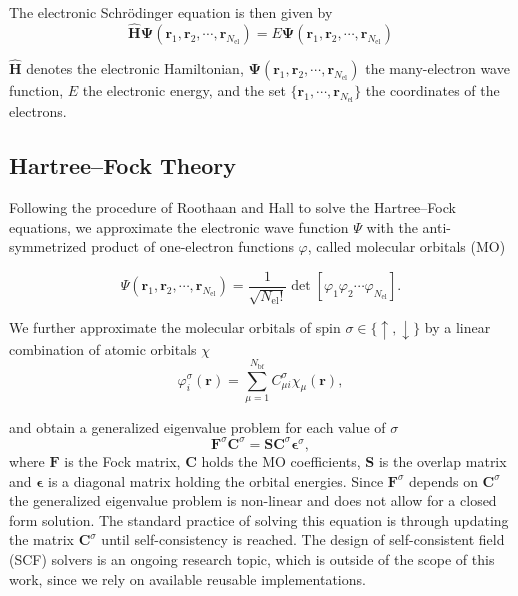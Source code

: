 \documentclass{article}
\begin{document}
The electronic Schrödinger equation is then given by
\begin{equation}
  \mathbf{\hat H} \mathbf \Psi(\mathbf r_1, \mathbf r_2, \cdots
  ,\mathbf r_{N_{\text{el}}}) = E\mathbf \Psi(\mathbf r_1,
  \mathbf r_2, \cdots ,\mathbf r_{N_{\text{el}}})
  \label{eq:SE}
\end{equation}

$\mathbf{\hat H}$ denotes the electronic Hamiltonian, $\mathbf
\Psi(\mathbf r_1, \mathbf r_2, \cdots ,\mathbf r_{N_{\text{el}}})$ the
many-electron wave function, $E$ the electronic energy, and the set
$\{\mathbf r_1, \cdots ,\mathbf{r}_{N_{\text{el}}}\}$ the coordinates
of the electrons.

\subsection{Hartree--Fock Theory}\label{subsec:HF}

Following the procedure of Roothaan and Hall \cite{Roothaan1951,
Hall1951} to solve the Hartree--Fock equations, we approximate the
electronic wave function $\Psi$ with the anti-symmetrized product of
one-electron functions $\varphi$, called molecular orbitals (MO)

\begin{equation}
  \Psi(\mathbf r_1, \mathbf r_2,\cdots, \mathbf
  r_{N_{\text{el}}}) =
  \frac{1}{\sqrt{N_{\text{el}}!}}\det[\varphi_1\varphi_2 \cdots
  \varphi_{N_{\text{el}}}]  .
  \label{eq:Wavefunction}
\end{equation}

We further approximate the molecular orbitals of spin $\sigma \in
\{\uparrow , \downarrow  \}$ by a linear combination of atomic orbitals $\chi$
\begin{equation}
  \varphi_i^\sigma(\mathbf r) = \sum_{\mu = 1}^{N_{\text{bf}}}
  C^\sigma_{\mu i}\chi_\mu(\mathbf r),
  \label{eq:AO}
\end{equation}

and obtain a generalized eigenvalue problem for each value of $\sigma$
\begin{equation}
  \mathbf F^\sigma  \mathbf C^\sigma =\mathbf S \mathbf
  C^\sigma \mathbf \epsilon^\sigma,
  \label{eq:GenEig}
\end{equation}
where $\mathbf{F}$ is the Fock matrix, $\mathbf{C}$ holds the MO
coefficients, $\mathbf{S}$ is the overlap matrix and
$\mathbf{\epsilon}$ is a diagonal matrix holding the orbital energies.
Since \( \mathbf F^\sigma \) depends on \( \mathbf C^\sigma \) the
generalized eigenvalue problem is non-linear and does not allow for a
closed form solution. The
standard practice of solving this equation is through updating the
matrix \( \mathbf C^\sigma  \) until
self-consistency is reached. The design of
self-consistent field (SCF) solvers is an ongoing research topic,
which is outside of the scope of this work, since we rely on
available reusable implementations.\cite{Lehtola2025}
\end{document}

